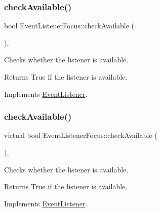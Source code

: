 \subsubsection{\texorpdfstring{check\+Available()}{checkAvailable()}\hspace{0.1cm}{\footnotesize\ttfamily [1/2]}}
{\footnotesize\ttfamily bool Event\+Listener\+Focus\+::check\+Available (\begin{DoxyParamCaption}{ }\end{DoxyParamCaption})\hspace{0.3cm}{\ttfamily [override]}, {\ttfamily [virtual]}}

Checks whether the listener is available.

\begin{DoxyReturn}{Returns}
True if the listener is available. 
\end{DoxyReturn}


Implements \hyperlink{classEventListener_adf9e4eb37ea6e94c05f4d1b6594bd35e}{Event\+Listener}.

\mbox{\label{classEventListenerFocus_acc03526a7e5478b87327f3e8c28ded12}} 
\subsubsection{\texorpdfstring{check\+Available()}{checkAvailable()}\hspace{0.1cm}{\footnotesize\ttfamily [2/2]}}
{\footnotesize\ttfamily virtual bool Event\+Listener\+Focus\+::check\+Available (\begin{DoxyParamCaption}{ }\end{DoxyParamCaption})\hspace{0.3cm}{\ttfamily [override]}, {\ttfamily [virtual]}}

Checks whether the listener is available.

\begin{DoxyReturn}{Returns}
True if the listener is available. 
\end{DoxyReturn}


Implements \hyperlink{classEventListener_adf9e4eb37ea6e94c05f4d1b6594bd35e}{Event\+Listener}.

\mbox{\label{classEventListenerFocus_a59fb63c7e692808b59c76e498afb026a}} 
